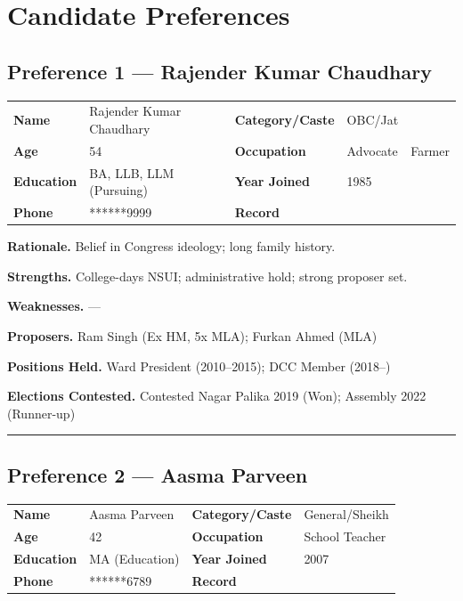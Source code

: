 \section{Candidate Preferences}
\subsection*{Preference 1 — Rajender Kumar Chaudhary}
\begin{tabularx}{\linewidth}{@{}lY lY@{}}
\textbf{Name} & Rajender Kumar Chaudhary & \textbf{Category/Caste} & OBC/Jat \\
\textbf{Age} & 54 & \textbf{Occupation} & Advocate & Farmer \\
\textbf{Education} & BA, LLB, LLM (Pursuing) & \textbf{Year Joined} & 1985 \\
\textbf{Phone} & ******9999 & \textbf{Record} &  \\
\end{tabularx}

\textbf{Rationale.} Belief in Congress ideology; long family history.

\textbf{Strengths.} College-days NSUI; administrative hold; strong proposer set.

\textbf{Weaknesses.} —

\textbf{Proposers.} Ram Singh (Ex HM, 5x MLA); Furkan Ahmed (MLA)

\textbf{Positions Held.} Ward President (2010–2015); DCC Member (2018–)

\textbf{Elections Contested.} Contested Nagar Palika 2019 (Won); Assembly 2022 (Runner-up)

\vspace{8pt}\hrule\vspace{10pt}

\subsection*{Preference 2 — Aasma Parveen}
\begin{tabularx}{\linewidth}{@{}lY lY@{}}
\textbf{Name} & Aasma Parveen & \textbf{Category/Caste} & General/Sheikh \\
\textbf{Age} & 42 & \textbf{Occupation} & School Teacher \\
\textbf{Education} & MA (Education) & \textbf{Year Joined} & 2007 \\
\textbf{Phone} & ******6789 & \textbf{Record} &  \\
\end{tabularx}

